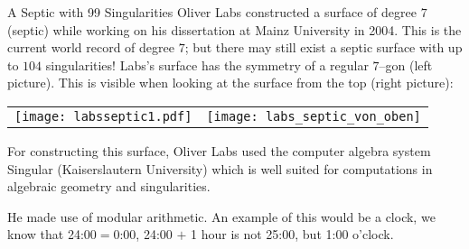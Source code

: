 \begin{surferPage}{A Septic with 99 Singularities}
    Oliver Labs constructed a surface of degree $7$ (septic) while working on his
    dissertation at Mainz University in 2004. This is the current world record
    of degree $7$; but there may still exist a septic surface with up to $104$
    singularities!  
    Labs's surface has the symmetry of a regular $7$--gon (left picture).
    This is visible when looking at the surface from the top (right picture):

    \vspace*{-0.3em}
    \begin{center}
      \begin{tabular}{c@{\qquad}c}
        \texttt{[image: labsseptic1.pdf]}
        &
        \texttt{[image: labs\_septic\_von\_oben]}
      \end{tabular}
    \end{center}
    \vspace*{-0.3em}

    For constructing this surface, Oliver Labs used the computer algebra system
    {\sc Singular} (Kaiserslautern University) which is well suited for
    computations in algebraic geometry and singularities.

    He made use of modular arithmetic. An example of this would be a clock, we know that 24:00$=$0:00, 24:00 $+$ 1 hour is
    not 25:00, but 1:00 o'clock.
\end{surferPage}
